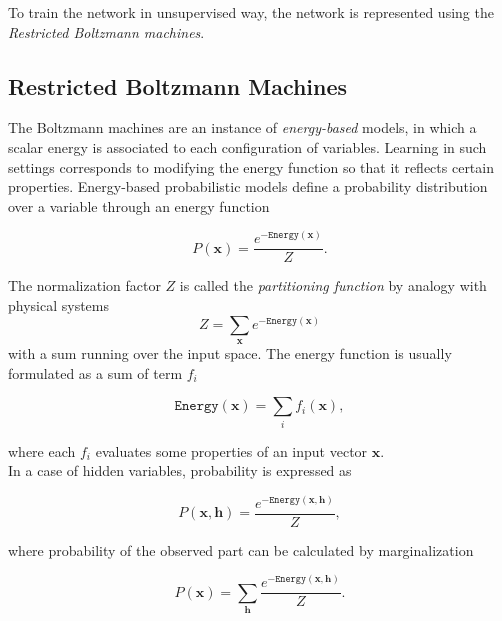 To train the network in unsupervised way, the network is represented using the \textit{Restricted Boltzmann machines}.





\subsection{Restricted Boltzmann Machines}

The Boltzmann machines are an instance of \textit{energy-based} models, in which a scalar energy is associated  to each configuration of variables. Learning in such settings corresponds to modifying the energy function so that it reflects certain properties. Energy-based probabilistic models define a probability distribution over a variable through an energy function

\begin{equation}
	P(\mathbf{x}) = \frac{e^{-\mathtt{Energy}(\mathbf{x})}}{Z}.
\end{equation}

The normalization factor $Z$ is called the \textit{partitioning function} by analogy with physical systems
\begin{equation}
	Z = \sum_{\mathbf{x}}e^{-\mathtt{Energy}(\mathbf{x})}
\end{equation}
 with a sum running over the input space. The energy function is usually formulated as a sum of term $f_i$
 
 \begin{equation}
 	\mathtt{Energy}(\mathbf{x}) = \sum_i f_i(\mathbf{x}),
 \end{equation}
 
 where each $f_i$ evaluates some properties of an input vector $\mathbf{x}$. \\
 
 In a case of hidden variables, probability is expressed as 
 
 \begin{equation}
	P(\mathbf{x}, \mathbf{h}) = \frac{e^{-\mathtt{Energy}(\mathbf{x}, \mathbf{h})}}{Z},
\end{equation}
 
 where probability of the observed part can be calculated by marginalization
 
 \begin{equation}
	P(\mathbf{x}) = \sum_{\mathbf{h}}\frac{e^{-\mathtt{Energy}(\mathbf{x}, \mathbf{h})}}{Z}.
\end{equation}

